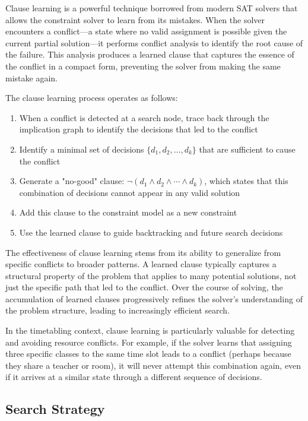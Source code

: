 \documentclass[12pt,a4paper]{article}
\begin{document}
Clause learning is a powerful technique borrowed from modern SAT solvers that allows the constraint solver to learn from its mistakes. When the solver encounters a conflict—a state where no valid assignment is possible given the current partial solution—it performs conflict analysis to identify the root cause of the failure. This analysis produces a learned clause that captures the essence of the conflict in a compact form, preventing the solver from making the same mistake again.

The clause learning process operates as follows:
\begin{enumerate}
    \item When a conflict is detected at a search node, trace back through the implication graph to identify the decisions that led to the conflict
    \item Identify a minimal set of decisions $\{d_1, d_2, \ldots, d_k\}$ that are sufficient to cause the conflict
    \item Generate a "no-good" clause: $\neg(d_1 \land d_2 \land \cdots \land d_k)$, which states that this combination of decisions cannot appear in any valid solution
    \item Add this clause to the constraint model as a new constraint
    \item Use the learned clause to guide backtracking and future search decisions
\end{enumerate}

The effectiveness of clause learning stems from its ability to generalize from specific conflicts to broader patterns. A learned clause typically captures a structural property of the problem that applies to many potential solutions, not just the specific path that led to the conflict. Over the course of solving, the accumulation of learned clauses progressively refines the solver's understanding of the problem structure, leading to increasingly efficient search.

In the timetabling context, clause learning is particularly valuable for detecting and avoiding resource conflicts. For example, if the solver learns that assigning three specific classes to the same time slot leads to a conflict (perhaps because they share a teacher or room), it will never attempt this combination again, even if it arrives at a similar state through a different sequence of decisions.

\subsection{Search Strategy}
\end{document}
